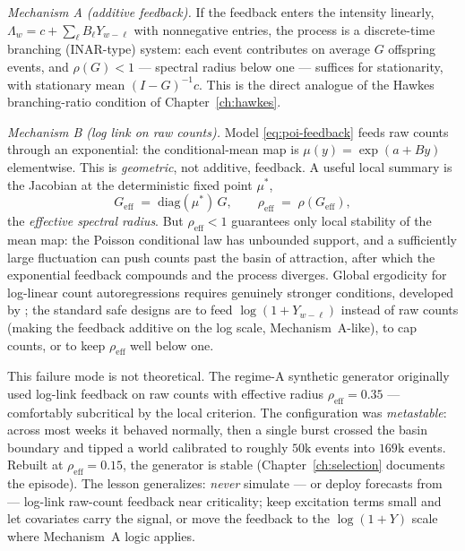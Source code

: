 \emph{Mechanism A (additive feedback).} If the feedback enters the intensity linearly,
$\Lambda_w = c + \sum_{\ell} B_{\ell} Y_{w-\ell}$ with nonnegative entries, the process is
a discrete-time branching (INAR-type) system: each event contributes on average $G$
offspring events, and $\rho(G) < 1$ --- spectral radius below one --- suffices for
stationarity, with stationary mean $(I - G)^{-1} c$. This is the direct analogue of the
Hawkes branching-ratio condition of Chapter~\ref{ch:hawkes}.

\emph{Mechanism B (log link on raw counts).} Model \eqref{eq:poi-feedback} feeds raw
counts through an exponential: the conditional-mean map is
$\mu(y) = \exp(a + B y)$ elementwise. This is \emph{geometric}, not additive, feedback. A
useful local summary is the Jacobian at the deterministic fixed point $\mu^{*}$,
\begin{equation}
G_{\mathrm{eff}} \;=\; \mathrm{diag}(\mu^{*})\, G,
\qquad
\rho_{\mathrm{eff}} \;=\; \rho(G_{\mathrm{eff}}),
\label{eq:poi-rhoeff}
\end{equation}
the \emph{effective spectral radius}. But $\rho_{\mathrm{eff}} < 1$ guarantees only local
stability of the mean map: the Poisson conditional law has unbounded support, and a
sufficiently large fluctuation can push counts past the basin of attraction, after which
the exponential feedback compounds and the process diverges. Global ergodicity for
log-linear count autoregressions requires genuinely stronger conditions, developed by
\cite{fokianos2009}; the standard safe designs are to feed $\log(1 + Y_{w-\ell})$ instead
of raw counts (making the feedback additive on the log scale, Mechanism~A-like), to cap
counts, or to keep $\rho_{\mathrm{eff}}$ well below one.

\begin{warning}
\label{warn:poi-metastable}
This failure mode is not theoretical. The regime-A synthetic generator originally used
log-link feedback on raw counts with effective radius $\rho_{\mathrm{eff}} = 0.35$ ---
comfortably subcritical by the local criterion. The configuration was \emph{metastable}:
across most weeks it behaved normally, then a single burst crossed the basin boundary and
tipped a world calibrated to roughly $50\mathrm{k}$ events into $169\mathrm{k}$ events.
Rebuilt at $\rho_{\mathrm{eff}} = 0.15$, the generator is stable (Chapter~\ref{ch:selection}
documents the episode). The lesson generalizes: \emph{never} simulate --- or deploy
forecasts from --- log-link raw-count feedback near criticality; keep excitation terms
small and let covariates carry the signal, or move the feedback to the $\log(1+Y)$ scale
where Mechanism~A logic applies.
\end{warning}

